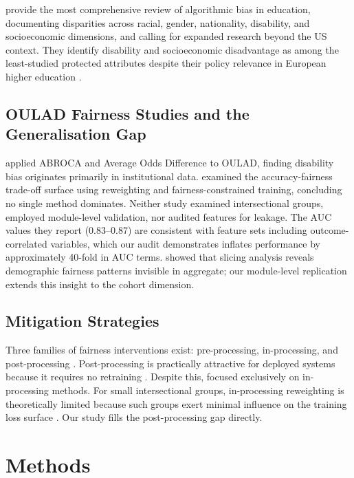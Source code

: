 \documentclass[12pt,a4paper]{article}
\begin{document}
\citet{baker2022} provide the most comprehensive review of algorithmic bias in
education, documenting disparities across racial, gender, nationality,
disability, and socioeconomic dimensions, and calling for expanded research
beyond the US context. They identify disability and socioeconomic disadvantage
as among the least-studied protected attributes despite their policy relevance
in European higher education \citep{viberg2018}.

\subsection{OULAD Fairness Studies and the Generalisation Gap}

\citet{idowu2024} applied ABROCA and Average Odds Difference to OULAD,
finding disability bias originates primarily in institutional data.
\citet{opoku2025} examined the accuracy-fairness trade-off surface using
reweighting and fairness-constrained training, concluding no single method
dominates. Neither study examined intersectional groups, employed module-level
validation, nor audited features for leakage. The AUC values they report
(0.83--0.87) are consistent with feature sets including outcome-correlated
variables, which our audit demonstrates inflates performance by approximately
40-fold in AUC terms. \citet{gardner2018} showed that slicing analysis
reveals demographic fairness patterns invisible in aggregate; our module-level
replication extends this insight to the cohort dimension.

\subsection{Mitigation Strategies}

Three families of fairness interventions exist: pre-processing, in-processing,
and post-processing \citep{hardt2016, verma2018}. Post-processing is
practically attractive for deployed systems because it requires no retraining
\citep{hardt2016}. Despite this, \citet{opoku2025} focused exclusively on
in-processing methods. For small intersectional groups, in-processing
reweighting is theoretically limited because such groups exert minimal
influence on the training loss surface \citep{hardt2016}. Our study fills the
post-processing gap directly.

\section{Methods}
\end{document}
